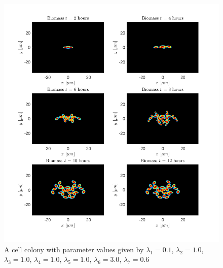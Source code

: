 \begin{figure}[h] %
    \centering
    \includegraphics[width= 1\textwidth]{
        chapter2/figures/Biomass_t_all_L1_0o10_L2_1o00_L3_1o00_L4_1o00_L5_1o00_L6_3o00_L7_0o60.png}
    \caption{A cell colony with parameter values given by
             $\lambda_1 = 0.1$,  
             $\lambda_2 = 1.0$, 
             $\lambda_3 = 1.0$, 
             $\lambda_4 = 1.0$, 
             $\lambda_5 = 1.0$, 
             $\lambda_6 = 3.0$, 
             $\lambda_7 = 0.6$}
    \label{fig:ColonySimulationNutrientFieldN210}
    \end{figure}
    \filbreak


